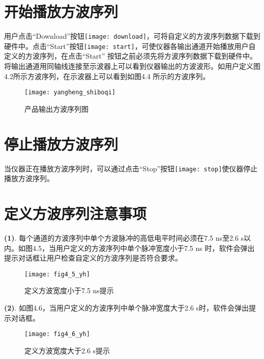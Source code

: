 \newpage
\section{\heiti 开始播放方波序列}
用户点击“Download”按钮\texttt{[image: download]}，可将自定义的方波序列数据下载到硬件中。点击“Start”按钮\texttt{[image: start]}，可使仪器各输出通道开始播放用户自定义的方波序列，在点击“Start” 按钮之前必须先将方波序列数据下载到硬件中。将输出通道用同轴线连接至示波器上可以看到仪器输出的方波波形。如用户定义图4.2所示方波序列，在示波器上可以看到如图4.4 所示的方波序列。

\vspace{2cm}

\begin{figure}[htbp]
\centering
\texttt{[image: yangheng\_shiboqi]}
\caption{产品输出方波序列图}
\end{figure}


\section{\heiti 停止播放方波序列}
当仪器正在播放方波序列时，可以通过点击“Stop”按钮\texttt{[image: stop]}使仪器停止播放方波序列。


\newpage
\section{\heiti 定义方波序列注意事项}

\vspace{0.4cm}
\noindent \textbf{(1)}. 每个通道的方波序列中单个方波脉冲的高低电平时间必须在7.5 ns至2.6 s以内。如图4.5，当用户定义的方波序列中单个脉冲宽度小于7.5 ns 时，软件会弹出提示对话框让用户检查自定义的方波序列是否符合要求。

\vspace{0.2cm}
\begin{figure}[H]
\centering
\texttt{[image: fig4\_5\_yh]}
\caption{定义方波宽度小于7.5 ns提示}
\end{figure}

\vspace{0.4cm}
\noindent \textbf{(2)}.  如图4.6，当用户定义的方波序列中单个脉冲宽度大于2.6 s时，软件会弹出提示对话框。

\vspace{0.2cm}
\begin{figure}[ht]
\centering
\texttt{[image: fig4\_6\_yh]}
\caption{定义方波宽度大于2.6 s提示}
\end{figure}

